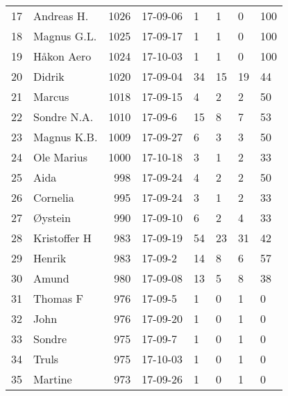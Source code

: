\begin{longtable}{|r|l|r|l|l|l|l|l|}
17 &           Andreas H. &  1026 &    17-09-06 &               1 &     1 &       0 &       100 \\
18 &          Magnus G.L. &  1025 &    17-09-17 &               1 &     1 &       0 &       100 \\
19 &           Håkon Aero &  1024 &    17-10-03 &               1 &     1 &       0 &       100 \\
20 &               Didrik &  1020 &    17-09-04 &              34 &    15 &      19 &        44 \\
21 &               Marcus &  1018 &    17-09-15 &               4 &     2 &       2 &        50 \\
22 &          Sondre N.A. &  1010 &     17-09-6 &              15 &     8 &       7 &        53 \\
23 &          Magnus K.B. &  1009 &    17-09-27 &               6 &     3 &       3 &        50 \\
24 &           Ole Marius &  1000 &    17-10-18 &               3 &     1 &       2 &        33 \\
25 &                 Aida &   998 &    17-09-24 &               4 &     2 &       2 &        50 \\
26 &             Cornelia &   995 &    17-09-24 &               3 &     1 &       2 &        33 \\
27 &              Øystein &   990 &    17-09-10 &               6 &     2 &       4 &        33 \\
28 &         Kristoffer H &   983 &    17-09-19 &              54 &    23 &      31 &        42 \\
29 &               Henrik &   983 &     17-09-2 &              14 &     8 &       6 &        57 \\
30 &                Amund &   980 &    17-09-08 &              13 &     5 &       8 &        38 \\
31 &             Thomas F &   976 &     17-09-5 &               1 &     0 &       1 &         0 \\
32 &                 John &   976 &    17-09-20 &               1 &     0 &       1 &         0 \\
33 &               Sondre &   975 &     17-09-7 &               1 &     0 &       1 &         0 \\
34 &                Truls &   975 &    17-10-03 &               1 &     0 &       1 &         0 \\
35 &              Martine &   973 &    17-09-26 &               1 &     0 &       1 &         0 \\

\end{longtable}

